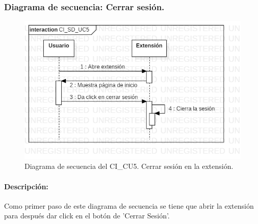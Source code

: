 \documentclass[12pt, a4paper, titlepage]{report}
\begin{document}
    			
    			\subsubsection{Diagrama de secuencia: Cerrar sesión.}
        			\begin{figure}[H]
        				\begin{center}    		    	\includegraphics[width=14cm]{./imagenes/Disenio/Componente_1/CI_SD_UC5.png}
        				\caption[Diagrama de secuencia 5 del Componente I]{Diagrama de secuencia del CI\_CU5. Cerrar sesión en la extensión.}
        				\end{center}
        			\end{figure}
        			
        			\paragraph{Descripción:}
        		        Como primer paso de este diagrama de secuencia se tiene que abrir la extensión para después dar click en el botón de 'Cerrar Sesión'.
        		
        		
\end{document}
